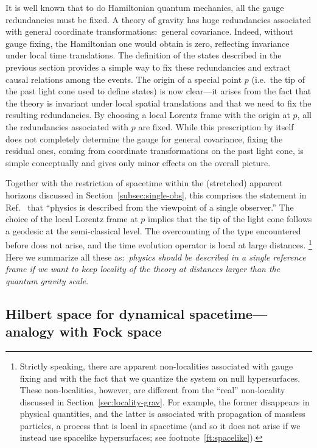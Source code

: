 \documentclass[12pt]{article}
\begin{document}
It is well known that to do Hamiltonian quantum mechanics, all the gauge 
redundancies must be fixed.  A theory of gravity has huge redundancies 
associated with general coordinate transformations:\ general covariance. 
Indeed, without gauge fixing, the Hamiltonian one would obtain is zero, 
reflecting invariance under local time translations.  The definition of 
the states described in the previous section provides a simple way to 
fix these redundancies and extract causal relations among the events. 
The origin of a special point $p$ (i.e.\ the tip of the past light cone 
used to define states) is now clear---it arises from the fact that the 
theory is invariant under local spatial translations and that we need 
to fix the resulting redundancies.  By choosing a local Lorentz frame 
with the origin at $p$, all the redundancies associated with $p$ are 
fixed.  While this prescription by itself does not completely determine 
the gauge for general covariance, fixing the residual ones, coming from 
coordinate transformations on the past light cone, is simple conceptually 
and gives only minor effects on the overall picture.

Together with the restriction of spacetime within the (stretched) apparent 
horizons discussed in Section~\ref{subsec:single-obs}, this comprises 
the statement in Ref.~\cite{Nomura:2011dt} that ``physics is described 
from the viewpoint of a single observer.''  The choice of the local 
Lorentz frame at $p$ implies that the tip of the light cone follows 
a geodesic at the semi-classical level.  The overcounting of the type 
encountered before does not arise, and the time evolution operator 
is local at large distances.%
\footnote{Strictly speaking, there are apparent non-localities associated 
 with gauge fixing and with the fact that we quantize the system on null 
 hypersurfaces.  These non-localities, however, are different from the 
 ``real'' non-locality discussed in Section~\ref{sec:locality-grav}. 
 For example, the former disappears in physical quantities, and the 
 latter is associated with propagation of massless particles, a process 
 that is local in spacetime (and so it does not arise if we instead use 
 spacelike hypersurfaces; see footnote~\ref{ft:spacelike}).}
Here we summarize all these as:\ {\it physics should be described in 
a single reference frame if we want to keep locality of the theory 
at distances larger than the quantum gravity scale}.


\subsection{Hilbert space for dynamical spacetime---analogy with Fock space}
\label{subsec:Hilbert}
\end{document}
